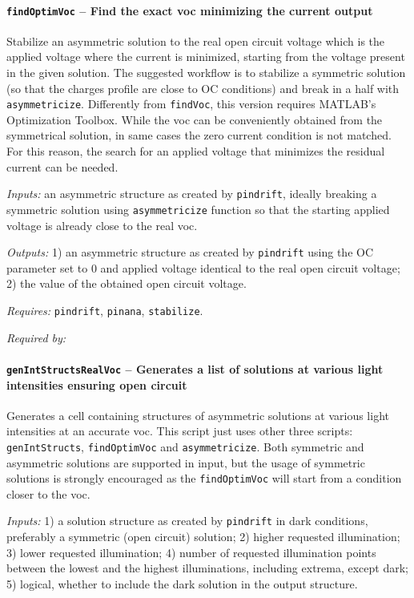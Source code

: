 		\paragraph{\texttt{find\-Optim\-Voc} -- Find the exact \gls{voc} minimizing the current output}
Stabilize an asymmetric solution to the real open circuit voltage
which is the applied voltage where the current is minimized,
starting from the voltage present in the given solution. The suggested
workflow is to stabilize a symmetric solution (so that the charges
profile are close to OC conditions) and break in a half with
\texttt{asymmetricize}.
Differently from \texttt{findVoc}, this version requires MATLAB's Optimization Toolbox.
While the \gls{voc} can be conveniently obtained from the symmetrical solution, in same cases the zero current condition is not matched.
For this reason, the search for an applied voltage that minimizes the residual current can be needed.
		
		\textit{Inputs:} an asymmetric structure as created by \texttt{pindrift}, ideally
    breaking a symmetric solution using \texttt{asymmetricize} function so that
    the starting applied voltage is already close to the real \gls{voc}.
    
\textit{Outputs:} 1) an asymmetric structure as created by \texttt{pindrift} using the OC
     parameter set to 0 and applied voltage identical to the real open
     circuit voltage;
2) the value of the obtained open circuit voltage.

\textit{Requires:} \texttt{pindrift}, \texttt{pinana}, \texttt{stabilize}.

\textit{Required by:} 

		\paragraph{\texttt{gen\-Int\-Structs\-Real\-Voc} -- Generates a list of solutions at various light intensities ensuring open circuit}
		Generates a cell containing structures of asymmetric solutions at various light intensities at an accurate \gls{voc}.
		This script just uses other three scripts: \texttt{gen\-Int\-Structs}, \texttt{find\-Optim\-Voc}
		 and \texttt{asymmetricize}. Both symmetric and asymmetric solutions are supported in input, but the usage of symmetric solutions is strongly encouraged as the \texttt{find\-Optim\-Voc} will start from a condition closer to the \gls{voc}.
		
				\textit{Inputs:} 1) a solution structure as created by \texttt{pindrift} in dark
				     conditions, preferably a symmetric (open circuit) solution;
				2) higher requested illumination;
				3) lower requested illumination;
				4) number of requested illumination points between the lowest and the highest illuminations, including extrema, except dark;
				5) logical, whether to include the dark solution in the output
				     structure.
				
